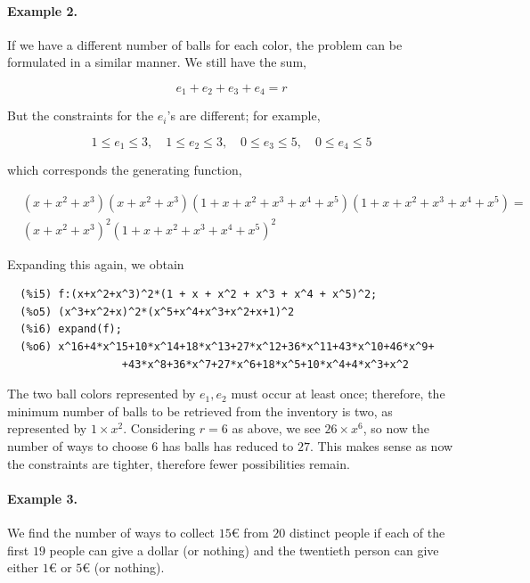 \paragraph{Example 2.} If we have a different number of balls for each color, the problem can be formulated in a similar manner. We still have the sum,

\begin{equation*}
  e_1 + e_2 + e_3 + e_4 = r
\end{equation*}

But the constraints for the $e_i$'s are different; for example,

\begin{equation*}
  1 \leq e_1 \leq 3, \quad 1 \leq e_2 \leq 3, \quad 0 \leq e_3 \leq 5, \quad  0 \leq e_4 \leq 5
\end{equation*}

which corresponds the generating function,

\begin{align*}
  &(x + x^2 + x^3)(x + x^2 + x^3)(1 + x + x^2 + x^3 + x^4 + x^5)(1 + x + x^2 + x^3 + x^4 + x^5) = \\
  &(x + x^2 + x^3)^2(1 + x + x^2 + x^3 + x^4 + x^5)^2
\end{align*}
  
Expanding this again, we obtain

\begin{verbatim}
  (%i5)	f:(x+x^2+x^3)^2*(1 + x + x^2 + x^3 + x^4 + x^5)^2;
  (%o5)	(x^3+x^2+x)^2*(x^5+x^4+x^3+x^2+x+1)^2
  (%i6)	expand(f);
  (%o6)	x^16+4*x^15+10*x^14+18*x^13+27*x^12+36*x^11+43*x^10+46*x^9+
                  +43*x^8+36*x^7+27*x^6+18*x^5+10*x^4+4*x^3+x^2
\end{verbatim}

The two ball colors represented by $e_1, e_2$ must occur at least once; therefore, the minimum number of balls to be retrieved from the inventory is two, as represented by $1 \times x^2$. Considering $r=6$ as above, we see $26 \times x^6$, so now the number of ways to choose $6$ has balls has reduced to $27$. This makes sense as now the constraints are tighter, therefore fewer possibilities remain.

\paragraph{Example 3.}  We find the number of ways to collect $15$€ from $20$ distinct people if each of the first $19$ people can give a dollar (or nothing) and the twentieth person can give either $1$€ or $5$€ (or nothing).


